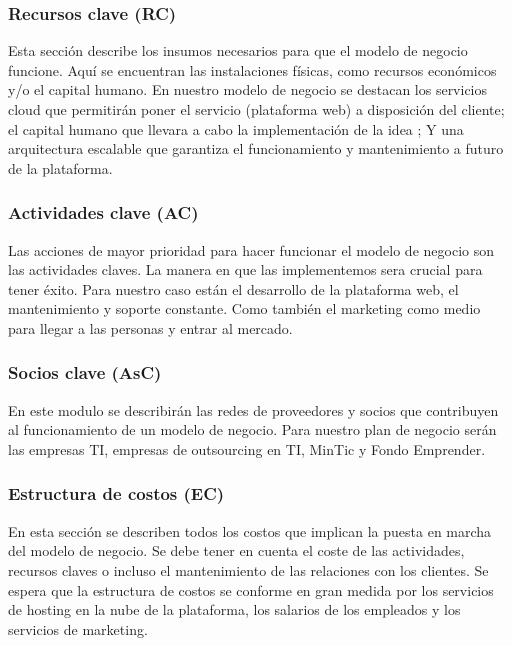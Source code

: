 \subsubsection*{Recursos clave (RC)}

Esta sección describe los insumos necesarios para que el modelo de negocio funcione. Aquí se encuentran las instalaciones físicas, como recursos económicos y/o el capital humano. En nuestro modelo de negocio se destacan los servicios cloud que permitirán poner el servicio (plataforma web) a disposición del cliente; el capital humano que llevara a cabo la implementación de la idea ; Y una arquitectura escalable que garantiza el funcionamiento y mantenimiento a futuro de la plataforma.

\subsubsection*{Actividades clave (AC)}

Las acciones de mayor prioridad para hacer funcionar el modelo de negocio son las actividades claves. La manera en que las implementemos sera crucial para tener éxito. Para nuestro caso están el desarrollo de la plataforma web, el mantenimiento y soporte constante. Como también el marketing como medio para llegar a las personas y entrar al mercado.

\subsubsection*{Socios clave (AsC)}

En este modulo se describirán las redes de proveedores y socios que contribuyen al funcionamiento de un modelo de negocio. Para nuestro plan de negocio serán las empresas TI, empresas de outsourcing en TI, MinTic y Fondo Emprender.

\subsubsection*{Estructura de costos (EC)}

En esta sección se describen todos los costos que implican la puesta en marcha del modelo de negocio. Se debe tener en cuenta el coste de las actividades, recursos claves o incluso el mantenimiento de las relaciones con los clientes. Se espera que la estructura de costos se conforme en gran medida por los servicios de hosting en la nube de la plataforma, los salarios de los empleados y los servicios de marketing.
